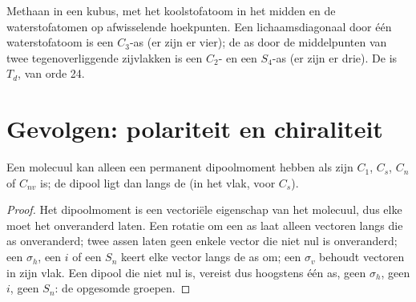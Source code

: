 \begin{omfigure}

{\small Methaan in een kubus, met het koolstofatoom in het midden en de
waterstofatomen op afwisselende hoekpunten. Een lichaamsdiagonaal door
één waterstofatoom is een $C_3$-as (er zijn er vier); de as door de
middelpunten van twee tegenoverliggende zijvlakken is een $C_2$- en een
$S_4$-as (er zijn er drie). De  is $T_d$, van orde 24.}
\end{omfigure}

\section{Gevolgen: polariteit en chiraliteit}

\begin{theorem}\label{thm:b3:point-groups:polar}
Een molecuul kan alleen een permanent dipoolmoment hebben als zijn
 $C_1$, $C_s$, $C_n$ of $C_{nv}$ is; de dipool ligt dan langs de
 (in het vlak, voor $C_s$).
\end{theorem}

\begin{proof}
Het dipoolmoment is een vectoriële eigenschap van het molecuul, dus elke
 moet het onveranderd laten. Een rotatie om een as laat
alleen vectoren langs die as onveranderd; twee assen laten geen enkele
vector die niet nul is onveranderd; een
$\sigma_h$, een $i$ of een $S_n$ keert elke vector langs de as om; een $\sigma_v$
behoudt vectoren in zijn vlak. Een dipool die niet nul is, vereist dus
hoogstens één as, geen $\sigma_h$, geen $i$, geen $S_n$: de opgesomde groepen.
\end{proof}

